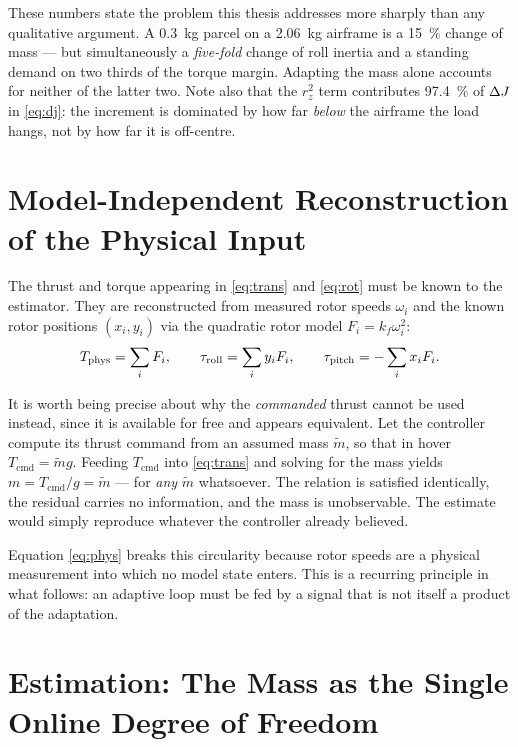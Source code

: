 These numbers state the problem this thesis addresses more sharply than
any qualitative argument. A \SI{0.3}{\kg} parcel on a \SI{2.06}{\kg}
airframe is a \SI{15}{\percent} change of mass --- but simultaneously a
\emph{five-fold} change of roll inertia and a standing demand on two
thirds of the torque margin. Adapting the mass alone accounts for neither
of the latter two. Note also that the $r_z^2$ term contributes
\SI{97.4}{\percent} of $\Delta J$ in \eqref{eq:dj}: the increment is dominated
by how far \emph{below} the airframe the load hangs, not by how far it is
off-centre.

\section{Model-Independent Reconstruction of the Physical Input}\label{sec:model:phys}

The thrust and torque appearing in \eqref{eq:trans} and \eqref{eq:rot}
must be known to the estimator. They are reconstructed from measured
rotor speeds $\omega_i$ and the known rotor positions $(x_i, y_i)$ via the
quadratic rotor model $F_i = k_f \omega_i^2$:
\begin{equation}
T_{\mathrm{phys}} = \sum_i F_i, \qquad
\tau_{\mathrm{roll}} = \sum_i y_i F_i, \qquad
\tau_{\mathrm{pitch}} = -\sum_i x_i F_i .
\label{eq:phys}
\end{equation}

It is worth being precise about why the \emph{commanded} thrust cannot be
used instead, since it is available for free and appears equivalent. Let
the controller compute its thrust command from an assumed mass
$\tilde{m}$, so that in hover $T_{\mathrm{cmd}} = \tilde{m} g$. Feeding
$T_{\mathrm{cmd}}$ into \eqref{eq:trans} and solving for the mass yields
$m = T_{\mathrm{cmd}} / g = \tilde{m}$ --- for \emph{any} $\tilde{m}$
whatsoever. The relation is satisfied identically, the residual carries no
information, and the mass is unobservable. The estimate would simply
reproduce whatever the controller already believed.

Equation \eqref{eq:phys} breaks this circularity because rotor speeds are
a physical measurement into which no model state enters. This is a
recurring principle in what follows: an adaptive loop must be fed by a
signal that is not itself a product of the adaptation.

\section{Estimation: The Mass as the Single Online Degree of Freedom}\label{sec:model:mhe}


